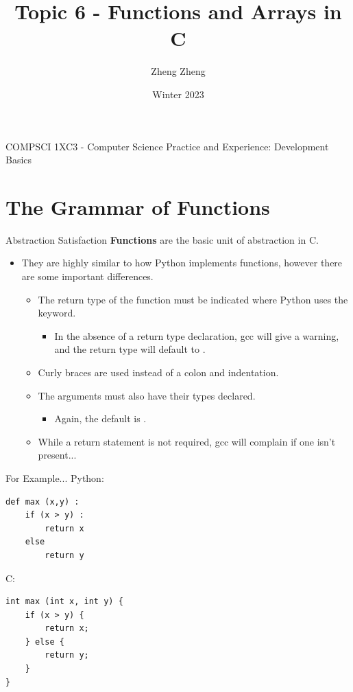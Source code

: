 \documentclass[11pt]{beamer}
\author{Zheng Zheng}
\title{Topic 6 - Functions and Arrays in C}
\institute{McMaster University}
\date{Winter 2023}
\let\OldTexttt\texttt
\renewcommand{\texttt}[1]{\OldTexttt{\color{teal}{#1}}}
\begin{document}
\begin{frame}
\center
COMPSCI 1XC3 - Computer Science Practice and Experience:
Development Basics
\titlepage
\end{frame}

\begin{frame}
\tableofcontents
\end{frame}

\section[syntax]{The Grammar of Functions} %
\begin{frame}{Abstraction Satisfaction}
\textbf{Functions} are the basic unit of abstraction in C.
\begin{itemize}
\item They are highly similar to how Python implements functions, however there are some important differences.  
\begin{itemize}
\item The return type of the function must be indicated where Python uses the \texttt{def} keyword.
\begin{itemize}
\item In the absence of a return type declaration, gcc will give a warning, and the return type will default to \texttt{int}.
\end{itemize}
\item Curly braces are used instead of a colon and indentation.
\item The arguments must also have their types declared.
\begin{itemize}
\item Again, the default is \texttt{int}.
\end{itemize}
\item While a return statement is not required, gcc will complain if one isn't present...
\end{itemize}
\end{itemize}
\end{frame}

\begin{frame}[fragile=singleslide]{For Example...}
Python:
\begin{lstlisting}[style=Python]
def max (x,y) :
	if (x > y) :
		return x
	else 
		return y
\end{lstlisting}
C: 
\begin{lstlisting}[style=C]
int max (int x, int y) {
	if (x > y) {
		return x;
	} else {
		return y;
	}
}
\end{lstlisting}
\end{frame}
\end{document}
